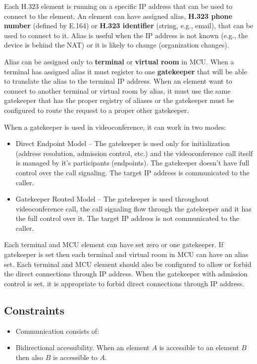 Each H.323 element is running on a specific IP address that can be used to 
connect to the element. An element can have assigned alias, \textbf{H.323 
phone number} (defined by E.164) or \textbf{H.323 identifier} (string, e.g., 
email), that can be used to connect to it. Alias is useful when the IP address 
is not known (e.g., the device is behind the NAT) or it is likely to change 
(organization changes).

Alias can be assigned only to \textbf{terminal} or \textbf{virtual room} in 
MCU. When a terminal has assigned alias it must register to one 
\textbf{gatekeeper} that will be able to translate the alias to the terminal 
IP address. When an element want to connect to another terminal or virtual 
room by alias, it must use the same gatekeeper that has the proper registry 
of aliases or the gatekeeper must be configured to route the request to a 
proper other gatekeeper.

When a gatekeeper is used in videoconference, it can work in two modes:
\begin{itemize}
\item Direct Endpoint Model -- The gatekeeper is used only for initialization 
(address resolution, admission control, etc.) and the videoconference call 
itself is managed by it's participants (endpoints). The gatekeeper doesn't 
have full control over the call signaling. The target IP address is 
communicated to the caller.
\item Gatekeeper Routed Model -- The gatekeeper is used throughout 
videoconference call, the call signaling flow through the gatekeeper and it 
has the full control over it. The target IP address is not communicated to 
the caller.
\end{itemize}

Each terminal and MCU element can have set zero or one gatekeeper. If 
gatekeeper is set then each terminal and virtual room in MCU can have an alias 
set. Each terminal and MCU element should also be configured to allow or 
forbid the direct connections through IP address. When the gatekeeper with 
admission control is set, it is appropriate to forbid direct connections 
through IP address.

\subsection{Constraints}

\begin{itemize}
\item Communication consists of:

\item Bidirectional accessibility. When an element $A$ is accessible to an 
element $B$ then also $B$ is accessible to $A$.
\end{itemize}

